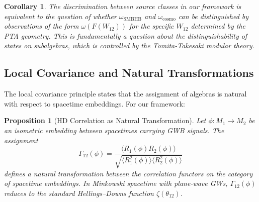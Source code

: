 \documentclass[11pt,a4paper]{article}
\newtheorem{proposition}{Proposition}[section]
\newtheorem{corollary}{Corollary}[section]
\begin{document}
\begin{corollary}
The discrimination between source classes in our framework is equivalent to the question of whether $\omega_{\text{SMBHB}}$ and $\omega_{\text{cosmo}}$ can be distinguished by observations of the form $\omega(F(W_{12}))$ for the specific $W_{12}$ determined by the PTA geometry. This is fundamentally a question about the distinguishability of states on subalgebras, which is controlled by the Tomita-Takesaki modular theory.
\end{corollary}

\subsection{Local Covariance and Natural Transformations}\label{sec:natural}

The local covariance principle states that the assignment of algebras is natural with respect to spacetime embeddings. For our framework:

\begin{proposition}[HD Correlation as Natural Transformation]\label{prop:hd-natural}
Let $\phi: M_1 \to M_2$ be an isometric embedding between spacetimes carrying GWB signals. The assignment
\begin{equation}
\Gamma_{12}(\phi) = \frac{\langle R_1(\phi) R_2(\phi) \rangle}{\sqrt{\langle R_1^2(\phi) \rangle \langle R_2^2(\phi) \rangle}}
\end{equation}
defines a natural transformation between the correlation functors on the category of spacetime embeddings. In Minkowski spacetime with plane-wave GWs, $\Gamma_{12}(\phi)$ reduces to the standard Hellings--Downs function $\zeta(\theta_{12})$.
\end{proposition}
\end{document}
